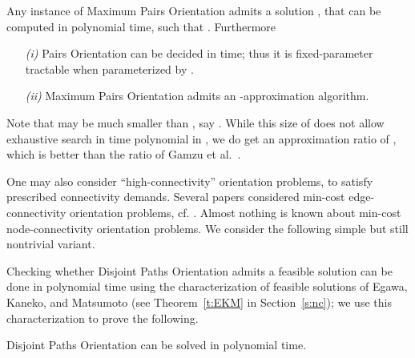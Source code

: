 \documentclass[envcountsame]{llncs}
\begin{document}
\begin{theorem} \label{t:kernel}
Any instance of {\sf Maximum Pairs Orientation} 
admits a solution , that can be computed in polynomial time, such that .
Furthermore
\begin{itemize}
\item[{\em (i)}]
{\sf  Pairs Orientation} can be decided in  time;
thus it is fixed-parameter tractable when parameterized by .
\item[{\em (ii)}]
{\sf Maximum Pairs Orientation} admits an -approximation algorithm.
\end{itemize}
\end{theorem} 

Note that  may be much smaller than , say .
While this size of  does not allow exhaustive search in time 
polynomial in , we do get an approximation ratio of 
, 
which is better than the ratio  of Gamzu et al.~\cite{segev-approx}.

One may also consider ``high-connectivity'' orientation problems,
to satisfy prescribed connectivity demands.
Several papers considered min-cost edge-connectivity orientation problems, cf. \cite{KNS}.
Almost nothing is known about min-cost node-connectivity orientation problems.
We consider the following simple but still nontrivial variant.

\vspace{0.1cm}

\begin{center} 
\end{center}

\vspace{0.1cm}

Checking whether {\sf  Disjoint Paths Orientation} admits a feasible solution can 
be done in polynomial time using the characterization of feasible solutions of 
Egawa, Kaneko, and Matsumoto \cite{EKM} (see Theorem~\ref{t:EKM} in Section~\ref{s:nc});
we use this characterization to prove the following.

\begin{theorem} \label{t:nc}
{\sf  Disjoint Paths Orientation} can be solved in polynomial time.
\end{theorem}
\end{document}
